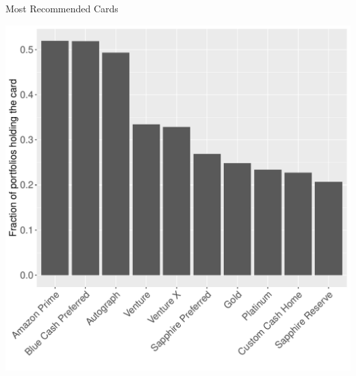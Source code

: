 \begin{frame}{Most Recommended Cards}
    \begin{center}
        \includegraphics[width=0.9\textheight]{../Figures/MC_Popularity_M100k.pdf}
    \end{center}
\end{frame} 



